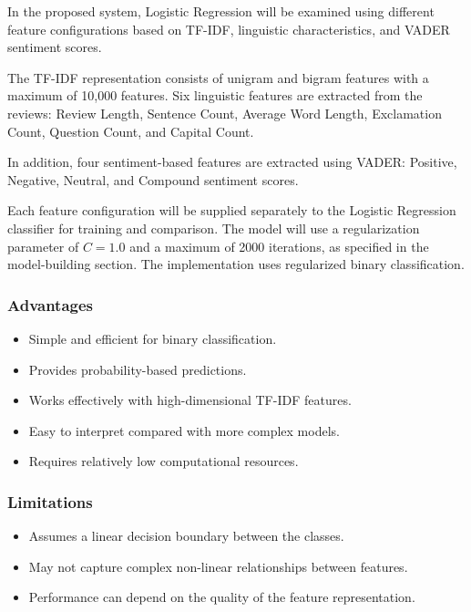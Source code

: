 \documentclass[12pt,a4paper]{report}
\begin{document}
In the proposed system, Logistic Regression will be examined using different feature configurations based on TF-IDF, linguistic characteristics, and VADER sentiment scores.

The TF-IDF representation consists of unigram and bigram features with a maximum of 10,000 features. Six linguistic features are extracted from the reviews: Review Length, Sentence Count, Average Word Length, Exclamation Count, Question Count, and Capital Count.

In addition, four sentiment-based features are extracted using VADER: Positive, Negative, Neutral, and Compound sentiment scores.

Each feature configuration will be supplied separately to the Logistic Regression classifier for training and comparison. The model will use a regularization parameter of \(C=1.0\) and a maximum of 2000 iterations, as specified in the model-building section. The implementation uses regularized binary classification.

\subsubsection*{Advantages}

\begin{itemize}
    \item Simple and efficient for binary classification.
    \item Provides probability-based predictions.
    \item Works effectively with high-dimensional TF-IDF features.
    \item Easy to interpret compared with more complex models.
    \item Requires relatively low computational resources.
\end{itemize}

\subsubsection*{Limitations}

\begin{itemize}
    \item Assumes a linear decision boundary between the classes.
    \item May not capture complex non-linear relationships between features.
    \item Performance can depend on the quality of the feature representation.
\end{itemize}
\end{document}
